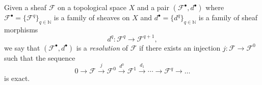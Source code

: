 \documentclass[12pt]{article}
\begin{document}
Given a sheaf $\mathcal F$ on a topological space $X$ and a pair $(\mathcal F^\bullet, d^\bullet)$ where $\mathcal F^\bullet = \{\mathcal F^q\}_{q\in\mathbb N}$ is a family of sheaves on $X$ and $d^\bullet=\{d^q\}_{q\in\mathbb N}$ is a family of sheaf morphisms
$$
d^q\colon\mathcal F^q\to\mathcal F^{q+1},
$$
we say that $(\mathcal F^\bullet, d^\bullet)$ is a \emph{resolution} of $\mathcal F$ if there exists an injection $j\colon\mathcal F\to\mathcal F^0$ such that the sequence
$$
0\to\mathcal F\overset{j}\to\mathcal F^0\overset{d^0}\to\mathcal F^1\overset{d_1}\to\cdots\to\mathcal F^q\to\dots
$$
is exact.
\end{document}

